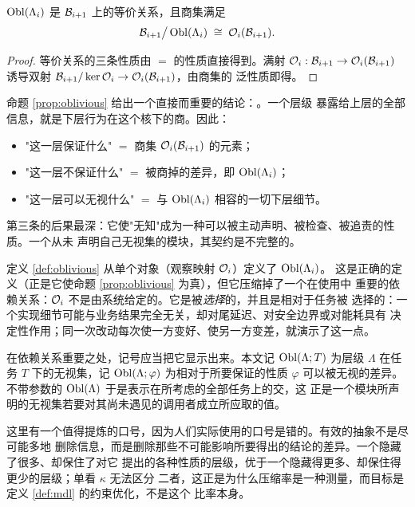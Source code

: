 \begin{proposition}[无视集的基本性质]\label{prop:oblivious}
$\operatorname{Obl}(\Lambda_i)$ 是 $\mathcal{B}_{i+1}$ 上的等价关系，且商集满足
\[
\mathcal{B}_{i+1} \big/ \operatorname{Obl}(\Lambda_i) \;\cong\; \mathcal{O}_i(\mathcal{B}_{i+1}) .
\]
\end{proposition}

\begin{proof}
等价关系的三条性质由 $=$ 的性质直接得到。满射 $\mathcal{O}_i: \mathcal{B}_{i+1} \to
\mathcal{O}_i(\mathcal{B}_{i+1})$ 诱导双射 $\mathcal{B}_{i+1}/\operatorname{ker}\mathcal{O}_i \to \mathcal{O}_i(\mathcal{B}_{i+1})$，由商集的
泛性质即得。
\end{proof}

命题 \ref{prop:oblivious} 给出一个直接而重要的结论：。一个层级
暴露给上层的全部信息，就是下层行为在这个核下的商。因此：

\begin{itemize}
\item "这一层保证什么" $=$ 商集 $\mathcal{O}_i(\mathcal{B}_{i+1})$ 的元素；
\item "这一层不保证什么" $=$ 被商掉的差异，即 $\operatorname{Obl}(\Lambda_i)$；
\item "这一层可以无视什么" $=$ 与 $\operatorname{Obl}(\Lambda_i)$ 相容的一切下层细节。
\end{itemize}

第三条的后果最深：它使"无知"成为一种可以被主动声明、被检查、被追责的性质。一个从未
声明自己无视集的模块，其契约是不完整的。

\begin{remark}[无视集相对于任务与性质]\label{rmk:oblivious-relative}
定义 \ref{def:oblivious} 从单个对象（观察映射 $\mathcal{O}_i$）定义了 $\operatorname{Obl}(\Lambda_i)$。
这是正确的定义（正是它使命题 \ref{prop:oblivious} 为真），但它压缩掉了一个在使用中
重要的依赖关系：$\mathcal{O}_i$ 不是由系统给定的。它是被\emph{选择}的，并且是相对于任务被
选择的：一个实现细节可能与业务结果完全无关，却对尾延迟、对安全边界或对能耗具有
决定性作用；同一次改动每次使一方变好、使另一方变差，就演示了这一点。

在依赖关系重要之处，记号应当把它显示出来。本文记 $\operatorname{Obl}(\Lambda; T)$ 为层级 $\Lambda$
在任务 $T$ 下的无视集，记 $\operatorname{Obl}(\Lambda; \varphi)$ 为相对于所要保证的性质 $\varphi$
可以被无视的差异。不带参数的 $\operatorname{Obl}(\Lambda)$ 于是表示在所考虑的全部任务上的交，这
正是一个模块所声明的无视集若要对其尚未遇见的调用者成立所应取的值。

这里有一个值得提炼的口号，因为人们实际使用的口号是错的。有效的抽象不是尽可能多地
删除信息，而是删除那些不可能影响所要得出的结论的差异。一个隐藏了很多、却保住了对它
提出的各种性质的层级，优于一个隐藏得更多、却保住得更少的层级；单看 $\kappa$ 无法区分
二者，这正是为什么压缩率是一种测量，而目标是定义 \ref{def:mdl} 的约束优化，不是这个
比率本身。
\end{remark}

